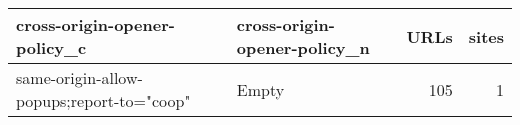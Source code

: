 \begin{tabular}{llrr}
\toprule
             cross-origin-opener-policy\_c & cross-origin-opener-policy\_n &  URLs &  sites \\
\midrule
same-origin-allow-popups;report-to="coop" &                        Empty &   105 &      1 \\
\bottomrule
\end{tabular}
